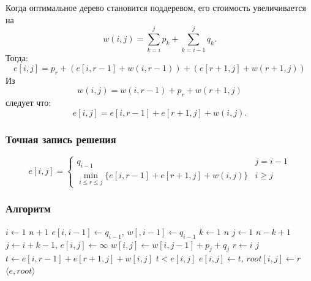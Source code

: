 \documentclass[hyperref={unicode=true}]{beamer}
\begin{document}
\begin{frame}
  Когда оптимальное дерево становится поддеревом, его стоимость
  увеличивается на 
  \[
  w(i,j) = \sum_{k=i}^j p_k + \sum_{k=i-1}^j q_k.
  \]
  Тогда:
  \[
  e[i,j] = p_r + (e[i,r-1] + w(i,r-1)) + (e[r+1,j] + w(r+1,j))
  \]
  Из 
  \[
  w(i,j) = w(i,r-1) + p_r + w(r+1,j)
  \]
  следует что:
  \[
  e[i,j] = e[i,r-1] + e[r+1,j] + w(i,j).
  \]
\end{frame}
\begin{frame}
  \frametitle{Точная запись решения}
  \[
  e[i,j] = \left\{
    \begin{array}{ll}
      q_{i-1} & j = i-1 \\
      \displaystyle\min_{i \leq r \leq j}\{e[i,r-1] + e[r+1,j] + w(i,j)\} & i \geq j
    \end{array}
    \right.
  \]
\end{frame}

\begin{frame}
  \frametitle{Алгоритм}
  \begin{codebox}
    \li \For $i \gets 1$ \To $n+1$ \Do
    \li $e[i,i-1] \gets q_{i-1}$, $w[,i-1] \gets q_{i-1}$ \End
    \li \For $k \gets 1$ \To $n$ \Do
    \li \For $j \gets 1$ \To $n-k+1$ \Do
    \li $j \gets i+k-1$, $e[i,j] \gets \infty$
    \li $w[i,j] \gets w[i,j-1] + p_j + q_j$
    \li \For $r \gets i$ \To $j$ \Do
    \li $t \gets e[i,r-1] + e[r+1,j] + w[i,j]$
    \li \If $t < e[i,j]$ 
    \li \Then $e[i,j] \gets t$, $root[i,j] \gets r$ \End
    \End \End \End
    \li \Return $\langle e, root \rangle$
  \end{codebox}
\end{frame}


\end{document}
